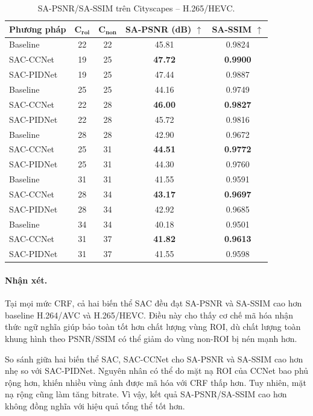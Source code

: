 \begin{table}[H]
\centering
\captionsetup{font=small}
\caption[SA-PSNR/SA-SSIM -- H.265/HEVC]{SA-PSNR/SA-SSIM trên Cityscapes -- H.265/HEVC.}
\label{tab:sa-metrics-x265}
\small
\begin{tabular}{lcccc}
\toprule
\textbf{Phương pháp} & $\boldsymbol{C_{roi}}$ & $\boldsymbol{C_{non}}$ & \textbf{SA-PSNR (dB)} $\uparrow$ & \textbf{SA-SSIM} $\uparrow$ \\
\midrule
Baseline & 22 & 22 & 45.81 & 0.9824 \\
SAC-CCNet & 19 & 25 & \textbf{47.72} & \textbf{0.9900} \\
SAC-PIDNet & 19 & 25 & 47.44 & 0.9887 \\
\midrule
Baseline & 25 & 25 & 44.16 & 0.9749 \\
SAC-CCNet & 22 & 28 & \textbf{46.00} & \textbf{0.9827} \\
SAC-PIDNet & 22 & 28 & 45.72 & 0.9816 \\
\midrule
Baseline & 28 & 28 & 42.90 & 0.9672 \\
SAC-CCNet & 25 & 31 & \textbf{44.51} & \textbf{0.9772} \\
SAC-PIDNet & 25 & 31 & 44.30 & 0.9760 \\
\midrule
Baseline & 31 & 31 & 41.55 & 0.9591 \\
SAC-CCNet & 28 & 34 & \textbf{43.17} & \textbf{0.9697} \\
SAC-PIDNet & 28 & 34 & 42.92 & 0.9685 \\
\midrule
Baseline & 34 & 34 & 40.18 & 0.9501 \\
SAC-CCNet & 31 & 37 & \textbf{41.82} & \textbf{0.9613} \\
SAC-PIDNet & 31 & 37 & 41.55 & 0.9598 \\
\bottomrule
\end{tabular}
\end{table}

\paragraph{Nhận xét.}
Tại mọi mức CRF, cả hai biến thể SAC đều đạt SA-PSNR và SA-SSIM cao hơn baseline H.264/AVC và H.265/HEVC. Điều này cho thấy cơ chế mã hóa nhận thức ngữ nghĩa giúp bảo toàn tốt hơn chất lượng vùng ROI, dù chất lượng toàn khung hình theo PSNR/SSIM có thể giảm do vùng non-ROI bị nén mạnh hơn.

So sánh giữa hai biến thể SAC, SAC-CCNet cho SA-PSNR và SA-SSIM cao hơn nhẹ so với SAC-PIDNet. Nguyên nhân có thể do mặt nạ ROI của CCNet bao phủ rộng hơn, khiến nhiều vùng ảnh được mã hóa với CRF thấp hơn. Tuy nhiên, mặt nạ rộng cũng làm tăng bitrate. Vì vậy, kết quả SA-PSNR/SA-SSIM cao hơn không đồng nghĩa với hiệu quả tổng thể tốt hơn.

